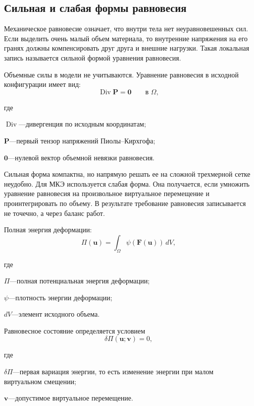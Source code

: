 \documentclass[14pt,a4paper]{extarticle}
\newif\ifwherefirst
\newcommand{\whereitem}[2]{%
    \ifwherefirst
        \wherefirstfalse
        #1\hspace{0.25em}---\hspace{0.25em}#2\par
    \else
        \noindent\hspace*{\parindent}\hphantom{где\enspace}#1\hspace{0.25em}---\hspace{0.25em}#2\par
    \fi
}
\newenvironment{whereblock}{%
    \vspace*{-1.55\baselineskip}%
    \begingroup
    \singlespacing
    \wherefirsttrue
    \par\indent где\enspace\ignorespaces
}{%
    \par\endgroup
    \par\vspace{\baselineskip}
}
\begin{document}
\subsection{Сильная и слабая формы равновесия}

Механическое равновесие означает, что внутри тела нет неуравновешенных сил. Если выделить очень малый объем материала, то внутренние напряжения на его гранях должны компенсировать друг друга и внешние нагрузки. Такая локальная запись называется сильной формой уравнения равновесия.

Объемные силы в модели не учитываются. Уравнение равновесия в исходной конфигурации имеет вид:
\begin{equation}
    \operatorname{Div}\mathbf{P}=\mathbf{0}
    \qquad
    \text{в }\Omega,
\end{equation}
\begin{whereblock}
\whereitem{\(\operatorname{Div}\)}{дивергенция по исходным координатам;}
\whereitem{\(\mathbf{P}\)}{первый тензор напряжений Пиолы--Кирхгофа;}
\whereitem{\(\mathbf{0}\)}{нулевой вектор объемной невязки равновесия.}
\end{whereblock}

Сильная форма компактна, но напрямую решать ее на сложной трехмерной сетке неудобно. Для МКЭ используется слабая форма. Она получается, если умножить уравнение равновесия на произвольное виртуальное перемещение и проинтегрировать по объему. В результате требование равновесия записывается не точечно, а через баланс работ.

Полная энергия деформации:
\begin{equation}
    \Pi(\mathbf{u})
    =
    \int_{\Omega}
    \psi(\mathbf{F}(\mathbf{u}))\,dV,
\end{equation}
\begin{whereblock}
\whereitem{\(\Pi\)}{полная потенциальная энергия деформации;}
\whereitem{\(\psi\)}{плотность энергии деформации;}
\whereitem{\(dV\)}{элемент исходного объема.}
\end{whereblock}

Равновесное состояние определяется условием
\begin{equation}
    \delta\Pi(\mathbf{u};\mathbf{v})=0,
\end{equation}
\begin{whereblock}
\whereitem{\(\delta\Pi\)}{первая вариация энергии, то есть изменение энергии при малом виртуальном смещении;}
\whereitem{\(\mathbf{v}\)}{допустимое виртуальное перемещение.}
\end{whereblock}
\end{document}
